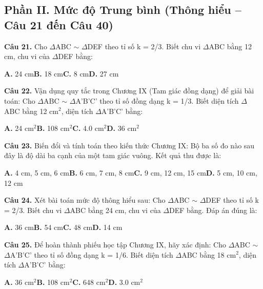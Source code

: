 \documentclass[11pt,a4paper]{article}
\begin{document}
\subsection*{\color{accent} Phần II. Mức độ Trung bình (Thông hiểu -- Câu 21 đến Câu 40)}
\textbf{\color{primary} Câu 21.} Cho $\Delta$ABC $\sim$ $\Delta$DEF theo tỉ số k = 2/3. Biết chu vi $\Delta$ABC bằng 12 cm, chu vi của $\Delta$DEF bằng:\par
\hspace*{1.5em}\textbf{A.} 24 cm\quad\quad \textbf{B.} 18 cm\quad\quad \textbf{C.} 8 cm\quad\quad \textbf{D.} 27 cm\par\vspace{2pt}
\textbf{\color{primary} Câu 22.} Vận dụng quy tắc trong Chương IX (Tam giác đồng dạng) để giải bài toán: Cho $\Delta$ABC $\sim$ $\Delta$A'B'C' theo tỉ số đồng dạng k = 1/3. Biết diện tích $\Delta$ABC bằng 12 cm$^2$, diện tích $\Delta$A'B'C' bằng:\par
\hspace*{1.5em}\textbf{A.} 24 cm$^2$\quad\quad \textbf{B.} 108 cm$^2$\quad\quad \textbf{C.} 4.0 cm$^2$\quad\quad \textbf{D.} 36 cm$^2$\par\vspace{2pt}
\textbf{\color{primary} Câu 23.} Biến đổi và tính toán theo kiến thức Chương IX: Bộ ba số đo nào sau đây là độ dài ba cạnh của một tam giác vuông. Kết quả thu được là:\par
\hspace*{1.5em}\textbf{A.} 4 cm, 5 cm, 6 cm\quad\quad \textbf{B.} 6 cm, 7 cm, 8 cm\quad\quad \textbf{C.} 9 cm, 12 cm, 15 cm\quad\quad \textbf{D.} 5 cm, 10 cm, 12 cm\par\vspace{2pt}
\textbf{\color{primary} Câu 24.} Xét bài toán mức độ thông hiểu sau: Cho $\Delta$ABC $\sim$ $\Delta$DEF theo tỉ số k = 2/3. Biết chu vi $\Delta$ABC bằng 24 cm, chu vi của $\Delta$DEF bằng. Đáp án đúng là:\par
\hspace*{1.5em}\textbf{A.} 36 cm\quad\quad \textbf{B.} 54 cm\quad\quad \textbf{C.} 48 cm\quad\quad \textbf{D.} 14 cm\par\vspace{2pt}
\textbf{\color{primary} Câu 25.} Để hoàn thành phiếu học tập Chương IX, hãy xác định: Cho $\Delta$ABC $\sim$ $\Delta$A'B'C' theo tỉ số đồng dạng k = 1/6. Biết diện tích $\Delta$ABC bằng 18 cm$^2$, diện tích $\Delta$A'B'C' bằng:\par
\hspace*{1.5em}\textbf{A.} 36 cm$^2$\quad\quad \textbf{B.} 108 cm$^2$\quad\quad \textbf{C.} 648 cm$^2$\quad\quad \textbf{D.} 3.0 cm$^2$\par\vspace{2pt}
\end{document}
